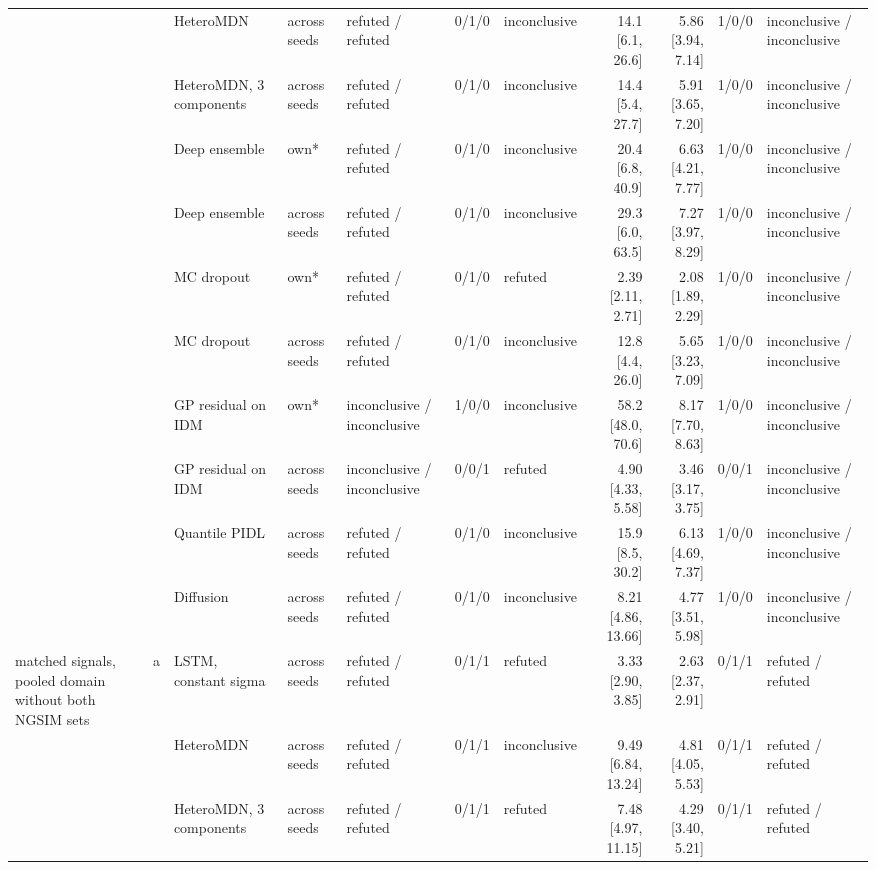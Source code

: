 \begin{longtable}{lllllrlrrrl}
 &  & HeteroMDN & across seeds & refuted / refuted & 0/1/0 & inconclusive & 14.1 [6.1, 26.6] & 5.86 [3.94, 7.14] & 1/0/0 & inconclusive / inconclusive \\
 &  & HeteroMDN, 3 components & across seeds & refuted / refuted & 0/1/0 & inconclusive & 14.4 [5.4, 27.7] & 5.91 [3.65, 7.20] & 1/0/0 & inconclusive / inconclusive \\
 &  & Deep ensemble & own* & refuted / refuted & 0/1/0 & inconclusive & 20.4 [6.8, 40.9] & 6.63 [4.21, 7.77] & 1/0/0 & inconclusive / inconclusive \\
 &  & Deep ensemble & across seeds & refuted / refuted & 0/1/0 & inconclusive & 29.3 [6.0, 63.5] & 7.27 [3.97, 8.29] & 1/0/0 & inconclusive / inconclusive \\
 &  & MC dropout & own* & refuted / refuted & 0/1/0 & refuted & 2.39 [2.11, 2.71] & 2.08 [1.89, 2.29] & 1/0/0 & inconclusive / inconclusive \\
 &  & MC dropout & across seeds & refuted / refuted & 0/1/0 & inconclusive & 12.8 [4.4, 26.0] & 5.65 [3.23, 7.09] & 1/0/0 & inconclusive / inconclusive \\
 &  & GP residual on IDM & own* & inconclusive / inconclusive & 1/0/0 & inconclusive & 58.2 [48.0, 70.6] & 8.17 [7.70, 8.63] & 1/0/0 & inconclusive / inconclusive \\
 &  & GP residual on IDM & across seeds & inconclusive / inconclusive & 0/0/1 & refuted & 4.90 [4.33, 5.58] & 3.46 [3.17, 3.75] & 0/0/1 & inconclusive / inconclusive \\
 &  & Quantile PIDL & across seeds & refuted / refuted & 0/1/0 & inconclusive & 15.9 [8.5, 30.2] & 6.13 [4.69, 7.37] & 1/0/0 & inconclusive / inconclusive \\
 &  & Diffusion & across seeds & refuted / refuted & 0/1/0 & inconclusive & 8.21 [4.86, 13.66] & 4.77 [3.51, 5.98] & 1/0/0 & inconclusive / inconclusive \\
\midrule
matched signals, pooled domain without both NGSIM sets & a & LSTM, constant sigma & across seeds & refuted / refuted & 0/1/1 & refuted & 3.33 [2.90, 3.85] & 2.63 [2.37, 2.91] & 0/1/1 & refuted / refuted \\
 &  & HeteroMDN & across seeds & refuted / refuted & 0/1/1 & inconclusive & 9.49 [6.84, 13.24] & 4.81 [4.05, 5.53] & 0/1/1 & refuted / refuted \\
 &  & HeteroMDN, 3 components & across seeds & refuted / refuted & 0/1/1 & refuted & 7.48 [4.97, 11.15] & 4.29 [3.40, 5.21] & 0/1/1 & refuted / refuted \\

\end{longtable}
